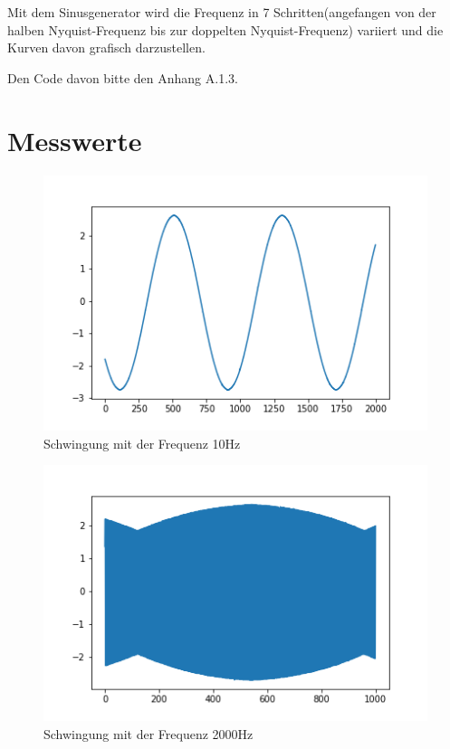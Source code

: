 \documentclass[12pt, oneside, a4paper, \docLanguage]{report}
\begin{document}
Mit dem Sinusgenerator wird die Frequenz in 7 Schritten(angefangen von der halben Nyquist-Frequenz bis zur doppelten Nyquist-Frequenz) variiert und die Kurven davon grafisch darzustellen.

Den Code davon bitte den Anhang A.1.3.
\section{Messwerte}
\label{chap:VERSUCH_5_MESSWERTE}

\begin{figure}[H]
	\centering\small
	\includegraphics[width=12cm]{10.png}
	\caption{Schwingung mit der Frequenz 10Hz}
\end{figure}

\begin{figure}[H]
	\centering\small
	\includegraphics[width=12cm]{2000.png}
	\caption{Schwingung mit der Frequenz 2000Hz}
\end{figure}
\end{document}
